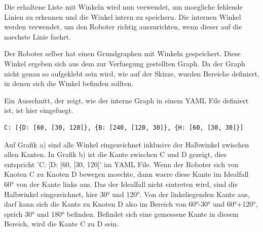 Die erhaltene Liste mit Winkeln wird nun verwendet, um moegliche fehlende Linien zu erkennen und die Winkel intern zu speichern. Die internen Winkel werden verwendet, um den Roboter richtig auszurichten, wenn dieser auf die naechste Linie faehrt.

Der Roboter selber hat einen Grundgraphen mit Winkeln gespeichert. Diese Winkel ergeben sich aus dem zur Verfuegung gestellten Graph.
Da der Graph nicht genau so aufgeklebt sein wird, wie auf der Skizze, wurden Bereiche definiert, in denen sich die Winkel befinden sollten.

Ein Ausschnitt, der zeigt, wie der interne Graph in einem YAML File definiert ist, ist hier eingefuegt.

\begin{verbatim}
C: [{D: [60, [30, 120]}, {B: [240, [120, 30]}, {H: [60, [30, 30]}]
\end{verbatim}

Auf Grafik a) sind alle Winkel eingezeichnet inklusive der Halbwinkel zwischen allen Kanten. In Grafik b) ist die Kante zwischen C und D gezeigt, dies entspricht 'C: [{D: [60, [30, 120]}' im YAML File. Wenn der Roboter sich von Knoten C zu Knoten D bewegen moechte, dann waere diese Kante im Idealfall 60° von der Kante links aus. Das der Idealfall nicht eintreten wird, sind die Halbwinkel eingezeichnet, hier 30° und 120°. Von der linksliegenden Kante aus, darf kann sich die Kante zu Knoten D also im Bereich von 60°-30° und 60°+120°, sprich 30° und 180° befinden. Befindet sich eine gemessene Kante in diesem Bereich, wird die Kante C zu D sein.

